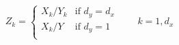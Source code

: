 \begin{equation*}
Z_k = %
\begin{cases}
X_k/Y_k & \text{if } d_y = d_x\\
X_k/Y & \text{if } d_y = 1\\
\end{cases}
\qquad k=1, d_x
\end{equation*}

